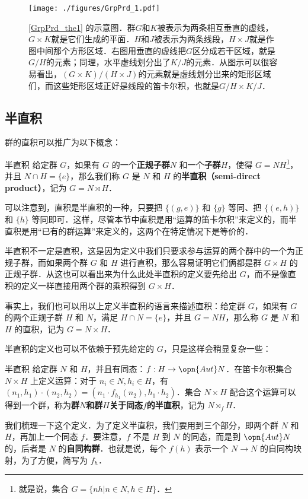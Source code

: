 \begin{figure}[ht]
\centering
\texttt{[image: ./figures/GrpPrd\_1.pdf]}
\caption{\autoref{GrpPrd_the1} 的示意图．群$G$和$K$被表示为两条相互垂直的虚线，$G\times K$就是它们生成的平面．$H$和$J$被表示为两条线段，$H\times J$就是作图中间那个方形区域．右图用垂直的虚线把$G$区分成若干区域，就是$G/H$的元素；同理，水平虚线划分出了$K/J$的元素．从图示可以很容易看出，$(G\times K)/(H\times J)$的元素就是虚线划分出来的矩形区域们，而这些矩形区域正好是线段的笛卡尔积，也就是$G/H\times K/J$．} \label{GrpPrd_fig1}
\end{figure}




\subsection{半直积}

群的直积可以推广为以下概念：

\begin{definition}{半直积}
给定群 $G$，如果有 $G$ 的一个\textbf{正规子群}$N$ 和一个\textbf{子群}$H$，使得 $G=NH$\footnote{就是说，集合 $G=\{nh|n\in N, h\in H\}$．}，并且 $N\cap H=\{e\}$，那么我们称 $G$ 是 $N$ 和 $H$ 的\textbf{半直积（semi-direct product）}，记为 $G=N\rtimes H$．
\end{definition}

可以注意到，直积是半直积的一种，只要把 $\{(g, e)\}$ 和 $\{g\}$ 等同、把 $\{(e, h)\}$ 和 $\{h\}$ 等同即可．这样，尽管本节中直积是用“运算的笛卡尔积”来定义的，而半直积是用“已有的群运算”来定义的，这两个在特定情况下是等价的．

半直积不一定是直积，这是因为定义中我们只要求参与运算的两个群中的一个为正规子群，而如果两个群 $G$ 和 $H$ 进行直积，那么容易证明它们俩都是群 $G\times H$ 的正规子群．从这也可以看出来为什么此处半直积的定义要先给出 $G$，而不是像直积的定义一样直接用两个群的乘积得到 $G\times H$．

事实上，我们也可以用以上定义半直积的语言来描述直积：给定群 $G$，如果有 $G$ 的两个正规子群 $H$ 和 $N$，满足 $H\cap N=\{e\}$，并且 $G=NH$，那么称 $G$ 是 $N$ 和 $H$ 的直积，记为 $G=N\times H$．

半直积的定义也可以不依赖于预先给定的 $G$，只是这样会稍显复杂一些：

\begin{definition}{半直积}
给定群 $N$ 和 $H$，并且有同态：$f:H\rightarrow \opn{Aut}N$．在笛卡尔积集合 $N\times H$ 上定义运算：对于 $n_i\in N, h_i\in H$，有 $(n_1, h_1)\cdot(n_2, h_2)=(n_1\cdot f_{h_1}(n_2), h_1\cdot h_2)$．集合 $N\times H$ 配合这个运算可以得到一个群，称为\textbf{群}$N$\textbf{和群}$H$\textbf{关于同态}$f$\textbf{的半直积}，记为 $N\rtimes_fH$．
\end{definition}

我们梳理一下这个定义．为了定义半直积，我们要用到三个部分，即两个群 $N$ 和 $H$，再加上一个同态 $f$．要注意，$f$ 不是 $H$ 到 $N$ 的同态，而是到 $\opn{Aut} N$ 的，后者是 $N$ 的\textbf{自同构群}．也就是说，每个 $f(h)$ 表示一个 $N\rightarrow N$ 的自同构映射，为了方便，简写为 $f_h$．















